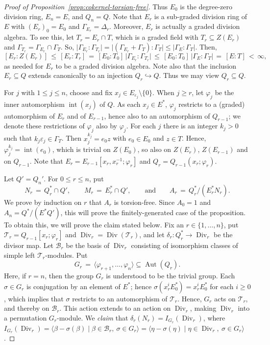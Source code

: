 \documentclass[11pt]{article}
\numberwithin{equation}{section}
\theoremstyle{plain}
\theoremstyle{remark}
\newcommand{\opn}{\operatorname}
\newcommand{\divr}{\opn{Div}_r}
\newcommand{\scT}{\mathcal T}
\newcommand{\scB}{\mathcal B}
\begin{document}
\begin{proof}[Proof of Proposition~\ref{prop:cokernel-torsion-free}]
Thus $E_0$ is the degree-zero division ring, $E_n=E$, and $Q_n=Q$. 
Note that $E_r$ is a sub-graded division ring of $E$ with $(E_r)_0 = E_0$ and $\Gamma_{E_r} = \Delta_r$.  
Moreover, $E_r$ is actually a graded division algebra.  To see this, 
let $T_r = E_r \cap T$, which is a graded field with $T_r \subseteq Z(E_r)$ and 
$\Gamma_{T_r}  = \Gamma_{E_r} \cap \Gamma _T$. So,
$\big | \Gamma_{E_r}: \Gamma_{T_r}\big | = \big |(\Gamma_{E_r} + \Gamma_{T}): \Gamma_{T}\big| 
\le |\Gamma_E :\Gamma_T| $.
 Then,
$$
[E_r: Z(E_r)] \,\le \, [E_r: T_r] \,=\, [E_0:T_0] \,\big | \Gamma_{E_r}: \Gamma_{T_r}\big | \, 
\le \, [E_0:T_0]\, |\Gamma_E :\Gamma_T| \, =\, [E:T] \,<\, \infty,
$$
as needed for $E_r$ to be a graded division algebra.
Note also that the inclusion $E_r \subseteq Q$ extends canonically  to an injection 
$Q_r \hookrightarrow Q$.  Thus we may view $Q_r \subseteq Q$.

For $j$ with $1\leq j\leq n$, choose and fix $x_j\in E_{\varepsilon_j}\setminus\{0\}$. 
When $j \ge r$, let $\varphi_j$ be the inner automorphism $\opn{int}(x_j)$ of $Q$.  
As each  $x_j\in E^*$, $\varphi_j$ restricts to a (graded) automorphism of $E_r$
and of $E_{r-1}$, hence also to an automorphism of $Q_{r-1}$; we denote these
restrictions of $\varphi_j$ also by $\varphi_j$.   For each $j$ there is an integer $k_j >0$
such that $k_j\varepsilon _j \in \Gamma_T$.  Then $x_j^{k_j}= e_0z$ with 
$e_0 \in E_0$ and $z\in T$. Hence, $\varphi_j^{k_j} = \opn{int}(e_0)$, which is trivial
on $Z(E_0)$, so also on  $Z(E_r)$, $Z(E_{r-1})$ and on $Q_{r-1}$.
Note that $E_r=E_{r-1}[x_r,x_r^{-1};\varphi_r]$ and $Q_r=Q_{r-1}(x_r;\varphi_r)$.

Let $Q'=Q_n'$. For $0\leq r\leq n$, put 
\begin{equation}
\label{def:N_rM_rA_r}
N_r\,=\,Q_r^*\cap Q', \qquad  M_r\,=\,E_r^*\cap Q', \qquad \text{and} \qquad
A_r\,=\,Q_r^*/(E_r^*N_r).
\end{equation}
We prove by induction on $r$ that $A_r$ is torsion-free. Since $A_0=1$ and $A_n=Q^*/(E^*Q')$, this will prove the 
finitely-generated case of the proposition. 
To obtain this, we will prove the claim stated below.  Fix an $r \in \{1,\dots,n\}$, put $\mathcal T_r=Q_{r-1}[x_r;\varphi_r]$ and  
$\divr=\opn{Div}(\mathcal T_r)$, and let $\delta_r\colon Q_r^*\to\divr$ be the divisor 
map.  Let $\scB_r$ be the basis of $\divr$ consisting of isomorphism classes of simple left $\scT_r$-modules.
Put
$$
        G_r \, =\, \langle\varphi_{r+1},\ldots,\varphi_n\rangle
        \subseteq \opn{Aut}(Q_r).
$$
Here, if $r=n$, then the group $G_r$ is understood to be the trivial group. 
Each $\sigma \in G_r$ is conjugation by an element of $E^*$; hence $\sigma(x_r^iE_0^*) = x_r^iE_0^*$
for each $i \ge 0$, which implies that $\sigma$ restricts to an automorphism of $\scT_r$.  Hence, $G_r$
acts on $\scT_r$, and thereby on $\scB_r$.  This action extends to an action on $\divr$, making
$\divr$ into a permutation $G_r$-module.   We {\it {claim}} 
that $\delta_r(N_r)=I_{G_r}(\divr)$, where 
$I_{G_r}(\divr)= \langle \beta-\sigma(\beta)\mid \beta\in \scB_r,\ \sigma\in G_r\rangle
= \langle \eta-\sigma(\eta)\mid \eta\in \divr,\ \sigma\in G_r\rangle$. 


\end{proof}
\end{document}
